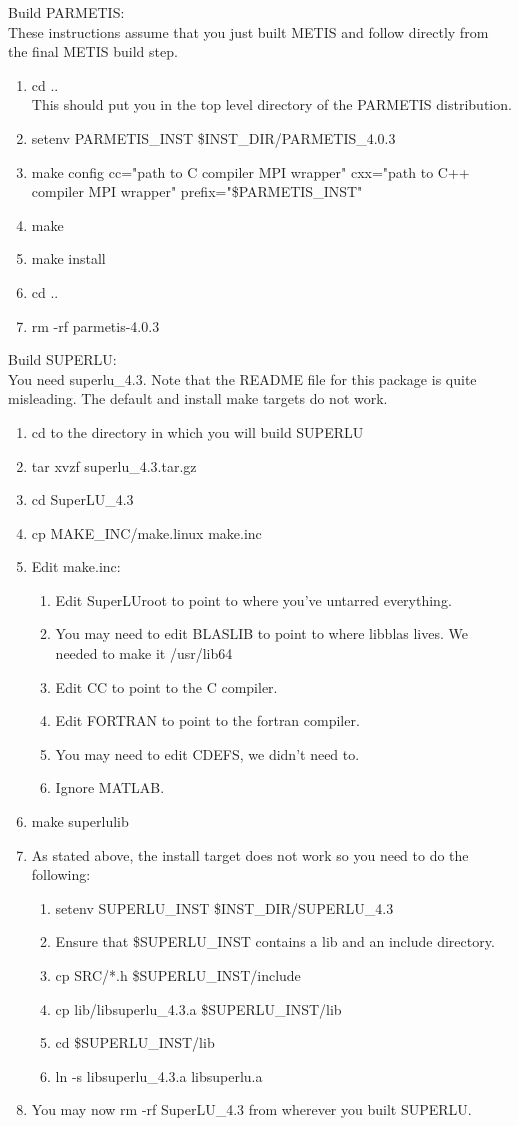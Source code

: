 \documentclass[11pt]{amsart}
\begin{document}
Build PARMETIS: \\
These instructions assume that you just built METIS and follow directly from
the final METIS build step.
\begin{enumerate}
\item cd .. \\
This should put you in the top level directory of the PARMETIS distribution.
\item setenv PARMETIS\_INST \$INST\_DIR/PARMETIS\_4.0.3
\item make config cc="path to C compiler MPI wrapper" cxx="path to C++ compiler
MPI wrapper" prefix="\$PARMETIS\_INST"
\item make
\item make install
\item cd ..
\item rm -rf parmetis-4.0.3
\end{enumerate}

Build SUPERLU: \\
You need superlu\_4.3.  Note that the README file for this package is quite
misleading.  The default and install make targets do not work.
\begin{enumerate}
\item cd to the directory in which you will build SUPERLU
\item tar xvzf superlu\_4.3.tar.gz
\item cd SuperLU\_4.3
\item cp MAKE\_INC/make.linux make.inc
\item Edit make.inc:
\begin{enumerate}
\item Edit SuperLUroot to point to where you've untarred everything.
\item You may need to edit BLASLIB to point to where libblas lives.  We needed
to make it /usr/lib64
\item Edit CC to point to the C compiler.
\item Edit FORTRAN to point to the fortran compiler.
\item You may need to edit CDEFS, we didn't need to.
\item Ignore MATLAB.
\end{enumerate}
\item make superlulib
\item As stated above, the install target does not work so you need to do the
following:
\begin{enumerate}
\item setenv SUPERLU\_INST \$INST\_DIR/SUPERLU\_4.3
\item Ensure that \$SUPERLU\_INST contains a lib and an include directory.
\item cp SRC/*.h \$SUPERLU\_INST/include
\item cp lib/libsuperlu\_4.3.a \$SUPERLU\_INST/lib
\item cd \$SUPERLU\_INST/lib
\item ln -s libsuperlu\_4.3.a libsuperlu.a
\end{enumerate}
\item You may now rm -rf SuperLU\_4.3 from wherever you built SUPERLU.
\end{enumerate}
\end{document}
